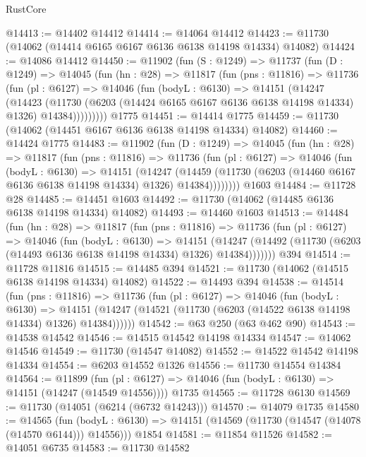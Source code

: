 \begin{lexlean}{RustCore}
\begin{coremodule}
@14413 := @14402 @14412
@14414 := @14064 @14412
@14423 := @11730 (@14062 (@14414 @6165 @6167 @6136 @6138 @14198 @14334) @14082)
@14424 := @14086 @14412
@14450 := @11902
    (fun (S : @1249) =>
    @11737
      (fun (D : @1249) =>
      @14045
        (fun (hn : @28) =>
        @11817
          (fun (pns : @11816) =>
          @11736
            (fun (pl : @6127) =>
            @14046
              (fun (bodyL : @6130) =>
              @14151
                (@14247
                  (@14423
                    (@11730
                      (@6203 (@14424 @6165 @6167 @6136 @6138 @14198 @14334) @1326)
                      @14384)))))))))
    @1775
@14451 := @14414 @1775
@14459 := @11730 (@14062 (@14451 @6167 @6136 @6138 @14198 @14334) @14082)
@14460 := @14424 @1775
@14483 := @11902
    (fun (D : @1249) =>
    @14045
      (fun (hn : @28) =>
      @11817
        (fun (pns : @11816) =>
        @11736
          (fun (pl : @6127) =>
          @14046
            (fun (bodyL : @6130) =>
            @14151
              (@14247
                (@14459
                  (@11730 (@6203 (@14460 @6167 @6136 @6138 @14198 @14334) @1326) @14384))))))))
    @1603
@14484 := @11728 @28
@14485 := @14451 @1603
@14492 := @11730 (@14062 (@14485 @6136 @6138 @14198 @14334) @14082)
@14493 := @14460 @1603
@14513 := @14484
    (fun (hn : @28) =>
    @11817
      (fun (pns : @11816) =>
      @11736
        (fun (pl : @6127) =>
        @14046
          (fun (bodyL : @6130) =>
          @14151
            (@14247 (@14492 (@11730 (@6203 (@14493 @6136 @6138 @14198 @14334) @1326) @14384)))))))
    @394
@14514 := @11728 @11816
@14515 := @14485 @394
@14521 := @11730 (@14062 (@14515 @6138 @14198 @14334) @14082)
@14522 := @14493 @394
@14538 := @14514
    (fun (pns : @11816) =>
    @11736
      (fun (pl : @6127) =>
      @14046
        (fun (bodyL : @6130) =>
        @14151 (@14247 (@14521 (@11730 (@6203 (@14522 @6138 @14198 @14334) @1326) @14384))))))
@14542 := @63 @250 (@63 @462 @90)
@14543 := @14538 @14542
@14546 := @14515 @14542 @14198 @14334
@14547 := @14062 @14546
@14549 := @11730 (@14547 @14082)
@14552 := @14522 @14542 @14198 @14334
@14554 := @6203 @14552 @1326
@14556 := @11730 @14554 @14384
@14564 := @11899
    (fun (pl : @6127) => @14046 (fun (bodyL : @6130) => @14151 (@14247 (@14549 @14556))))
    @1735
@14565 := @11728 @6130
@14569 := @11730 (@14051 (@6214 (@6732 @14243)))
@14570 := @14079 @1735
@14580 := @14565
    (fun (bodyL : @6130) => @14151 (@14569 (@11730 (@14547 (@14078 (@14570 @6144))) @14556)))
    @1854
@14581 := @11854 @11526
@14582 := @14051 @6735
@14583 := @11730 @14582

\end{coremodule}
\end{lexlean}
